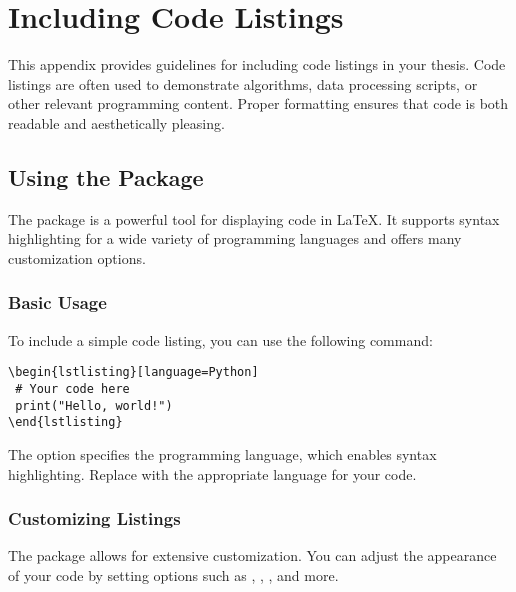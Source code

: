 \chapter{Including Code Listings}\label{app:codelistings}
	This appendix provides guidelines for including code listings in your thesis. 
	Code listings are often used to demonstrate algorithms, data processing scripts, or other relevant programming content. 
	Proper formatting ensures that code is both readable and aesthetically pleasing.

	\section{Using the  Package}
		The  package is a powerful tool for displaying code in LaTeX. 
		It supports syntax highlighting for a wide variety of programming languages and offers many customization options.

		\subsection{Basic Usage}

			To include a simple code listing, you can use the following command:

\noindent\lstinline|\begin{lstlisting}[language=Python]|\\[-0.7em]
\lstinline|	# Your code here|\\[-0.7em]
\lstinline|	print("Hello, world!")|\\[-0.7em]
\lstinline|\end{lstlisting}|

			The  option specifies the programming language, which enables syntax highlighting. 
			Replace  with the appropriate language for your code.


		\subsection{Customizing Listings}

			The  package allows for extensive customization. 
			You can adjust the appearance of your code by setting options such as , , , and more.

